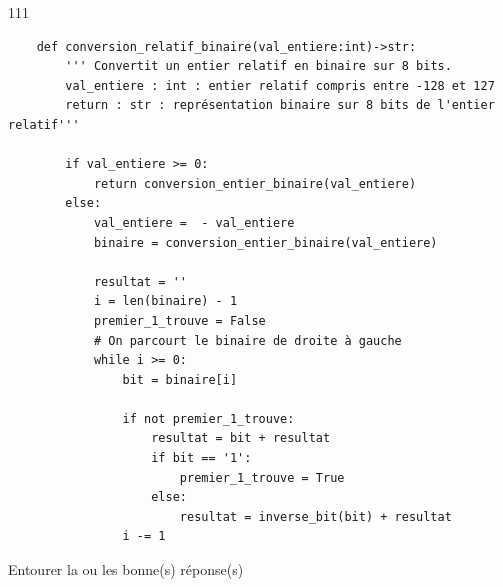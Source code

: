 \documentclass[a4paper,10pt]{report}
\def\ptsexoD{2}
\begin{document}
    \begin{answer}{1}{11}
        \begin{verbatim}
    def conversion_relatif_binaire(val_entiere:int)->str:
        ''' Convertit un entier relatif en binaire sur 8 bits. 
        val_entiere : int : entier relatif compris entre -128 et 127
        return : str : représentation binaire sur 8 bits de l'entier relatif'''
    
        if val_entiere >= 0:
            return conversion_entier_binaire(val_entiere)
        else:
            val_entiere =  - val_entiere
            binaire = conversion_entier_binaire(val_entiere)
            
            resultat = ''
            i = len(binaire) - 1
            premier_1_trouve = False
            # On parcourt le binaire de droite à gauche
            while i >= 0:
                bit = binaire[i]

                if not premier_1_trouve:
                    resultat = bit + resultat
                    if bit == '1':
                        premier_1_trouve = True
                    else:
                        resultat = inverse_bit(bit) + resultat
                i -= 1
                  \end{verbatim}
        \end{answer}
    
    
\exods{\ptsexoD}


Entourer la ou les bonne(s) réponse(s)
\end{document}
